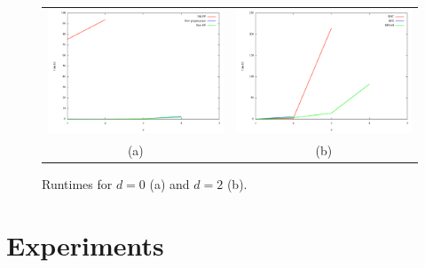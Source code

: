 
\begin{figure}[t]
  \centering
\begin{tabular}{cc}
  \includegraphics[width=0.9\columnwidth]{pics/xtag-k2-dist0} & 
\includegraphics[width=0.9\columnwidth]{pics/xtag-k2-dist2}\\[-0.2cm]
(a) & (b)
\end{tabular}
\vspace{-0.3cm}
\caption{Runtimes for $d=0$ (a) and $d=2$ (b).}
  \label{fig:runtimes}
\vspace{-0.5cm}
\end{figure}


\section{Experiments} 
\label{sec:experiments}

